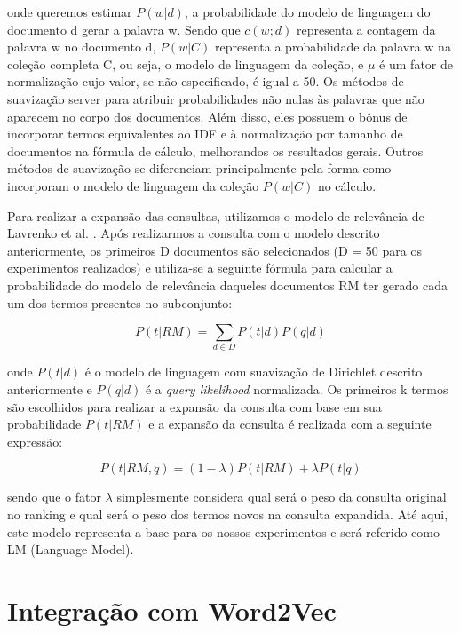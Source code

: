 \documentclass{article}
\begin{document}
onde queremos estimar $ P(w|d) $, a probabilidade do modelo de linguagem do documento d gerar a palavra w. Sendo que $ c(w;d) $ 
representa a contagem da palavra w no documento d, $ P(w|C) $ representa a probabilidade da palavra w na coleção completa C, ou seja, 
o modelo de linguagem da coleção, e $ \mu $ é um fator de normalização cujo valor, se não especificado, é igual a 50. Os métodos de 
suavização server para atribuir probabilidades não nulas às palavras que não aparecem no corpo dos documentos. Além disso, eles
possuem o bônus de incorporar termos equivalentes ao IDF e à normalização por tamanho de documentos na fórmula de cálculo,
melhorandos os resultados gerais. Outros métodos de suavização se diferenciam principalmente pela forma como incorporam o 
modelo de linguagem da coleção $ P(w|C) $ no cálculo.

Para realizar a expansão das consultas, utilizamos o modelo de relevância de Lavrenko et al. \cite{lavrenko2001}. Após realizarmos
a consulta com o modelo descrito anteriormente, os primeiros D documentos são selecionados (D = 50 para os experimentos realizados)
e utiliza-se a seguinte fórmula para calcular a probabilidade do modelo de relevância daqueles documentos RM ter gerado cada um dos 
termos presentes no subconjunto:

\begin{equation}\label{eq:dirichlet_relevance_model}
P(t|RM) = \sum_{d \in D} P(t|d)P(q|d)
\end{equation}

onde $ P(t|d) $ é o modelo de linguagem com suavização de Dirichlet descrito anteriormente e $ P(q|d) $ é a \textit{query likelihood}
normalizada. Os primeiros k termos são escolhidos para realizar a expansão da consulta com base em sua probabilidade $ P(t|RM) $
e a expansão da consulta é realizada com a seguinte expressão:

\begin{equation}\label{eq:query_interpolation}
P(t|RM,q) = (1-\lambda) P(t|RM) + \lambda P(t|q)
\end{equation}

sendo que o fator $ \lambda $ simplesmente considera qual será o peso da consulta original no ranking e qual será o peso dos 
termos novos na consulta expandida. Até aqui, este modelo representa a base para os nossos experimentos e será referido como
LM (Language Model).

\section{Integração com Word2Vec}
\end{document}
